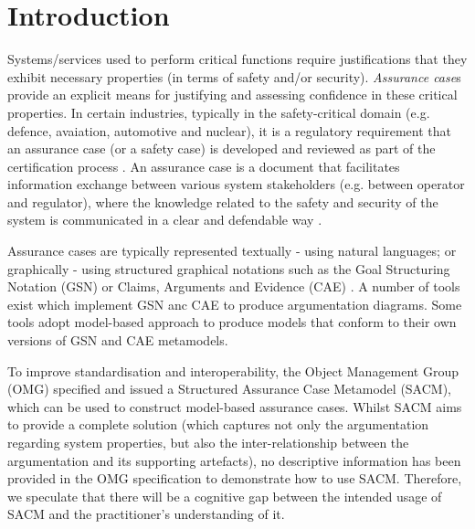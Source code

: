 \section{Introduction}
Systems/services used to perform critical functions require justifications that they exhibit necessary properties (in terms of safety and/or security). \textit{Assurance case}s provide an explicit means for justifying and assessing confidence in these critical properties. In certain industries, typically in the safety-critical domain (e.g. defence, avaiation, automotive and nuclear), it is a regulatory requirement that an assurance case (or a safety case) is developed and reviewed as part of the certification process \cite{healthFound}.
An assurance case is a document that facilitates information exchange between various system stakeholders (e.g. between operator and regulator), where the knowledge related to the safety and security of the system is communicated in a clear and defendable way \cite{}. 

Assurance cases are typically represented textually - using natural languages; or graphically - using structured graphical notations such as the Goal Structuring Notation (GSN) \cite{} or Claims, Arguments and Evidence (CAE) \cite{}. A number of tools exist which implement GSN anc CAE to produce argumentation diagrams. Some tools adopt model-based approach to produce models that conform to their own versions of GSN and CAE metamodels. 


To improve standardisation and interoperability, the Object Management Group (OMG) specified and issued a Structured Assurance Case Metamodel (SACM), which can be used to construct model-based assurance cases. 
Whilst SACM aims to provide a complete solution (which captures not only the argumentation regarding system properties, but also the inter-relationship between the argumentation and its supporting artefacts), no descriptive information has been provided in the OMG specification to demonstrate how to use SACM. Therefore, we speculate that there will be a cognitive gap between the intended usage of SACM and the practitioner's understanding of it. 

